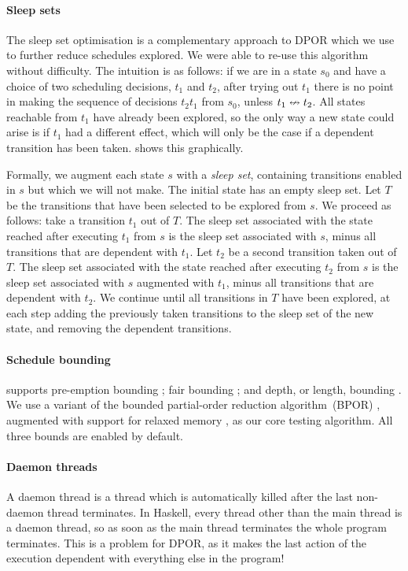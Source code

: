 \paragraph{Sleep sets}
The sleep set optimisation \parencite{godefroid1996} is a
complementary approach to DPOR which we use to further reduce
schedules explored.  We were able to re-use this algorithm without
difficulty.  The intuition is as follows: if we are in a state $s_{0}$
and have a choice of two scheduling decisions, $t_{1}$ and $t_{2}$,
after trying out $t_{1}$ there is no point in making the sequence of
decisions $t_{2}t_{1}$ from $s_{0}$, unless $t_{1} \nleftrightarrow t_{2}$.
All states reachable from $t_{1}$ have already been explored, so the
only way a new state could arise is if $t_{1}$ had a different effect,
which will only be the case if a dependent transition has been taken.
 shows this graphically.

Formally, we augment each state $s$ with a \emph{sleep set},
containing transitions enabled in $s$ but which we will not make.  The
initial state has an empty sleep set.  Let $T$ be the transitions that
have been selected to be explored from $s$.  We proceed as follows:
take a transition $t_{1}$ out of $T$.  The sleep set associated with
the state reached after executing $t_{1}$ from $s$ is the sleep set
associated with $s$, minus all transitions that are dependent with
$t_{1}$.  Let $t_{2}$ be a second transition taken out of $T$.  The
sleep set associated with the state reached after executing $t_{2}$
from $s$ is the sleep set associated with $s$ augmented with $t_{1}$,
minus all transitions that are dependent with $t_{2}$.  We continue
until all transitions in $T$ have been explored, at each step adding
the previously taken transitions to the sleep set of the new state,
and removing the dependent transitions.

\paragraph{Schedule bounding}
\dejafu{} supports pre-emption bounding \parencite{musuvathi2007};
fair bounding \parencite{musuvathi2008}; and depth, or length,
bounding \parencite{russell2002}.  We use a variant of the bounded
partial-order reduction algorithm~(BPOR) \parencite{coons2013},
augmented with support for relaxed memory \parencite{zhang2015}, as
our core testing algorithm.  All three bounds are enabled by default.

\paragraph{Daemon threads}
A daemon thread is a thread which is automatically killed after the
last non-daemon thread terminates.  In Haskell, every thread other
than the main thread is a daemon thread, so as soon as the main thread
terminates the whole program terminates.  This is a problem for DPOR,
as it makes the last action of the execution dependent with everything
else in the program!

